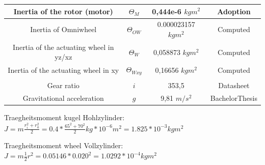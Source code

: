 \documentclass[twoside,colorback,accentcolor=tud4c,11pt]{tudreport}
\begin{document}
\begin{table}[]
\begin{tabular}{cccc}
\multicolumn{1}{|c|}{Inertia of the rotor (motor)}                                                                      & \multicolumn{1}{c|}{$\Theta_{M}$}           & \multicolumn{1}{c|}{0,444e-6 $kgm^{2}$}    & \multicolumn{1}{c|}{Adoption}              \\ \hline
\multicolumn{1}{|c|}{Inertia of Omniwheel}                                                                              & \multicolumn{1}{c|}{$\Theta_{OW}$}          & \multicolumn{1}{c|}{0.000023157 $kgm^{2}$} & \multicolumn{1}{c|}{Computed}              \\ \hline
\multicolumn{1}{|c|}{Inertia of the actuating wheel in yz/xz}                                                            & \multicolumn{1}{c|}{$\Theta_{W}$}           & \multicolumn{1}{c|}{0,058873 $kgm^{2}$}    & \multicolumn{1}{c|}{Computed}              \\ \hline
\multicolumn{1}{|c|}{Inertia of the actuating wheel in xy}                                                              & \multicolumn{1}{c|}{$\Theta_{Wxy}$}         & \multicolumn{1}{c|}{0,16656 $kgm^{2}$}     & \multicolumn{1}{c|}{Computed}              \\ \hline
                                                                                                                        &                                              &                                                            &                                            \\ \hline
\multicolumn{1}{|c|}{Gear ratio}                                                                                        & \multicolumn{1}{c|}{$i$}                       & \multicolumn{1}{c|}{353,5}                                 & \multicolumn{1}{c|}{Datasheet}             \\ \hline
\multicolumn{1}{|c|}{Gravitational acceleration}                                                                        & \multicolumn{1}{c|}{$g$}                       & \multicolumn{1}{c|}{9,81 $m/s^{2}$}        & \multicolumn{1}{c|}{BachelorThesis}        \\ \hline
\end{tabular}
\end{table}

Traegheitsmoment kugel Hohlzylinder: $J=m \frac{r_i^2+r_a^2}{2} = 0.4 * \frac{65^2+70^2}{2} kg *10^ {-6} m^2=1.825 *10^{-3} kg m^2$ 

Traegheitsmoment wheel Vollzylinder: $J=m \frac{1}{2} r^2 = 0.05146 * 0.020^2 = 1.0292 * 10^{-4} kg m^2$ 
\end{document}
